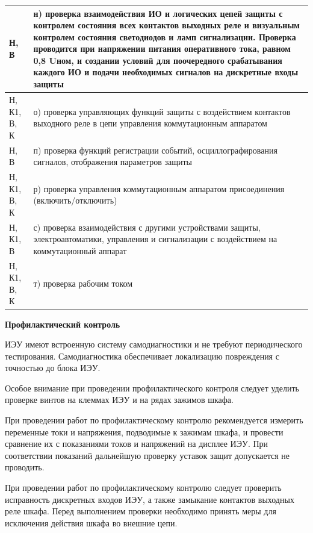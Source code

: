 \begin{longtable}{
  |>{\raggedright\arraybackslash}m{2cm}
  |>{\raggedright\arraybackslash}m{14.8cm}|
}
	   Н, В & н) проверка взаимодействия ИО и логических цепей защиты с контролем состояния всех контактов выходных реле и визуальным контролем состояния светодиодов и ламп сигнализации. Проверка проводится при напряжении питания оперативного тока, равном 0,8 Uном, и создании условий для поочередного срабатывания каждого ИО и подачи необходимых сигналов на дискретные входы защиты \\ \hline
Н, К1, В, К & о) проверка управляющих функций защиты с воздействием контактов выходного реле в цепи управления коммутационным аппаратом \\ \hline
	   Н, В & п) проверка функций регистрации событий, осциллографирования сигналов, отображения параметров защиты \\ \hline
Н, К1, В, К & р) проверка управления коммутационным аппаратом присоединения (включить/отключить) \\ \hline
   Н, К1, В & с) проверка взаимодействия с другими устройствами защиты, электроавтоматики, управления и сигнализации с воздействием на коммутационный аппарат \\ \hline
Н, К1, В, К & т) проверка рабочим током \\ \hline
	   
\end{longtable}
\normalsize
\setlength{\extrarowheight}{0.0cm}

\newpage

\par
\textbf{Профилактический контроль}

\par\sloppy
ИЭУ имеют встроенную систему самодиагностики и не требуют периодического тестирования. Самодиагностика обеспечивает локализацию повреждения с точностью до блока ИЭУ.

\par
Особое внимание при проведении профилактического контроля следует уделить проверке винтов на клеммах ИЭУ и на рядах зажимов шкафа.

\par
При проведении работ по профилактическому контролю рекомендуется измерить переменные токи и напряжения, подводимые к зажимам шкафа, и провести сравнение их с показаниями токов и напряжений на дисплее ИЭУ.
При соответствии показаний дальнейшую проверку уставок защит допускается не проводить.

\par
При проведении работ по профилактическому контролю следует проверить исправность дискретных входов ИЭУ, а также замыкание контактов выходных реле шкафа.
Перед выполнением проверки необходимо принять меры для исключения действия шкафа во внешние цепи.

